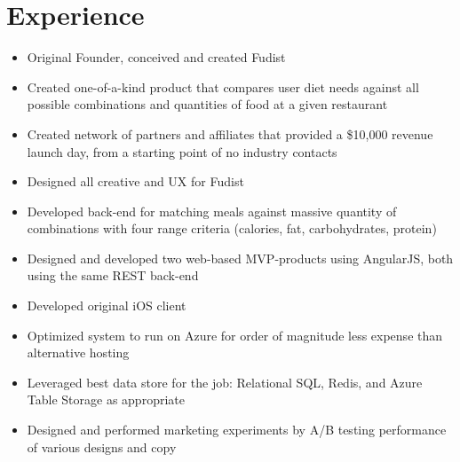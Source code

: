 \documentclass[12pt,letterpaper,sans]{moderncv}
\begin{document}
\section{Experience}
    \begin{itemize}[leftmargin=1.24in]
    	\item Original Founder, conceived and created Fudist		
        \item Created one-of-a-kind product that compares user diet needs against all possible combinations and quantities of food at a given restaurant
        \item Created network of partners and affiliates that provided a \$10,000 revenue launch day, from a starting point of no industry contacts
		\item Designed all creative and UX for Fudist                       
        \item Developed back-end for matching meals against massive quantity of combinations with four range criteria (calories, fat, carbohydrates, protein)
        \item Designed and developed two web-based MVP-products using AngularJS, both using the same REST back-end
        \item Developed original iOS client
        \item Optimized system to run on Azure for order of magnitude less expense than alternative hosting
        \item Leveraged best data store for the job: Relational SQL, Redis, and Azure Table Storage as appropriate
        \item Designed and performed marketing experiments by A/B testing performance of various designs and copy
    \end{itemize}
\end{document}
